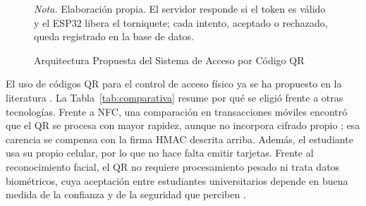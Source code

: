 \documentclass[stu,11pt,floatsintext,biblatex]{apa7}
\renewcommand{\figurenote}[1]{\par\noindent\textit{\notelabel.} #1\par}
\renewcommand{\notelabel}{Nota}%
\begin{document}
\begin{figure}[tbp]
  \caption{Arquitectura Propuesta del Sistema de Acceso por Código QR}
  \label{fig:arquitectura}
  \centering
  \figurenote{Elaboración propia. El servidor responde si el token es válido
  y el ESP32 libera el torniquete; cada intento, aceptado o rechazado, queda
  registrado en la base de datos.}
\end{figure}

El uso de códigos QR para el control de acceso físico ya se ha propuesto en
la literatura \parencite{kao2011physical}. La Tabla~\ref{tab:comparativa}
resume por qué se eligió frente a otras tecnologías. Frente a NFC, una
comparación en transacciones móviles encontró que el QR se procesa con mayor
rapidez, aunque no incorpora cifrado propio
\parencite{harnaningrum2024comparison}; esa carencia se compensa con la firma
HMAC descrita arriba. Además, el estudiante usa su propio celular, por lo que
no hace falta emitir tarjetas. Frente al reconocimiento facial, el QR no
requiere procesamiento pesado ni trata datos biométricos, cuya aceptación entre
estudiantes universitarios depende en buena medida de la confianza y de la
seguridad que perciben \parencite{rukhiran2023user}.
\end{document}
